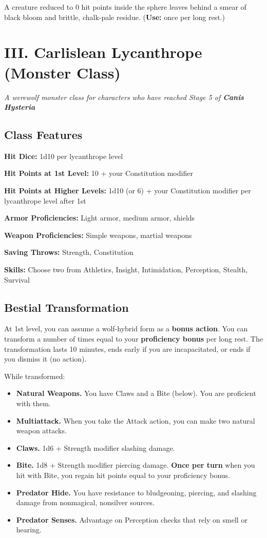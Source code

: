\documentclass{apotheosis-book}
\begin{document}
A creature reduced to 0 hit points inside the sphere leaves behind a smear of black bloom and brittle, chalk-pale residue.
(\textbf{Use:} once per long rest.)

\newpage

\section{III. Carlislean Lycanthrope (Monster Class)}
\textit{A werewolf monster class for characters who have reached Stage 5 of \textbf{Canis Hysteria}}

\subsection*{Class Features}
\textbf{Hit Dice:} 1d10 per lycanthrope level

\textbf{Hit Points at 1st Level:} 10 + your Constitution modifier

\textbf{Hit Points at Higher Levels:} 1d10 (or 6) + your Constitution modifier per lycanthrope level after 1st

\textbf{Armor Proficiencies:} Light armor, medium armor, shields

\textbf{Weapon Proficiencies:} Simple weapons, martial weapons

\textbf{Saving Throws:} Strength, Constitution

\textbf{Skills:} Choose two from Athletics, Insight, Intimidation, Perception, Stealth, Survival

\subsection*{Bestial Transformation}
At 1st level, you can assume a wolf-hybrid form as a \textbf{bonus action}. You can transform a number of times equal to your \textbf{proficiency bonus} per long rest. The transformation lasts 10 minutes, ends early if you are incapacitated, or ends if you dismiss it (no action).

While transformed:
\begin{itemize}
\item \textbf{Natural Weapons.} You have Claws and a Bite (below). You are proficient with them.
\item \textbf{Multiattack.} When you take the Attack action, you can make two natural weapon attacks.
\item \textbf{Claws.} 1d6 + Strength modifier slashing damage.
\item \textbf{Bite.} 1d8 + Strength modifier piercing damage. \textbf{Once per turn} when you hit with Bite, you regain hit points equal to your proficiency bonus.
\item \textbf{Predator Hide.} You have resistance to bludgeoning, piercing, and slashing damage from nonmagical, nonsilver sources.
\item \textbf{Predator Senses.} Advantage on Perception checks that rely on smell or hearing.
\end{itemize}
\end{document}
